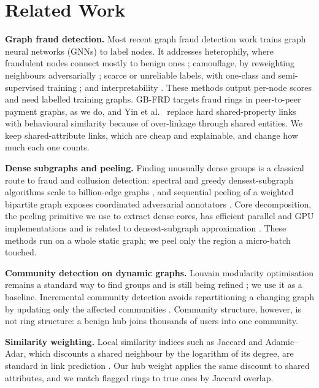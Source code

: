 \section{Related Work}
\label{sec:related}
\textbf{Graph fraud detection.} Most recent graph fraud detection work trains
graph neural networks (GNNs) to label nodes. It addresses heterophily, where
fraudulent nodes connect mostly to benign ones \cite{hu2025hhgfd,lv2026mandate};
camouflage, by reweighting neighbours adversarially \cite{liu2025robust}; scarce
or unreliable labels, with one-class and semi-supervised training
\cite{li2025ocgfd,giles2023suspicious,peng2023csocan}; and interpretability
\cite{yu2024ingfd}. These methods output per-node scores and need labelled
training graphs. GB-FRD \cite{pan2025gbfrd} targets fraud rings in peer-to-peer
payment graphs, as we do, and Yin et al.\ \cite{yin2022behavioral} replace hard
shared-property links with behavioural similarity because of over-linkage
through shared entities. We keep shared-attribute links, which are cheap and
explainable, and change how much each one counts.

\textbf{Dense subgraphs and peeling.} Finding unusually dense groups is a
classical route to fraud and collusion detection: spectral and greedy
densest-subgraph algorithms scale to billion-edge graphs \cite{feng2024unified},
and sequential peeling of a weighted bipartite graph exposes coordinated
adversarial annotators \cite{karaaslanli2025crowd}. Core decomposition, the
peeling primitive we use to extract dense cores, has efficient parallel and
GPU implementations \cite{ahmad2023gpukcore,li2021graphblas} and is related to
densest-subgraph approximation \cite{dhulipala2022dp}. These methods run on a
whole static graph; we peel only the region a micro-batch touched.

\textbf{Community detection on dynamic graphs.} Louvain modularity optimisation
remains a standard way to find groups and is still being refined
\cite{li2023dplouvain}; we use it as a baseline. Incremental community
detection avoids repartitioning a changing graph by updating only the
affected communities \cite{zhang2026incremental,abughofa2021incremental}.
Community structure, however, is not ring structure: a benign hub joins
thousands of users into one community.

\textbf{Similarity weighting.} Local similarity indices such as Jaccard and
Adamic--Adar, which discounts a shared neighbour by the logarithm of its
degree, are standard in link prediction \cite{varma2022jaccard}. Our hub weight
applies the same discount to shared attributes, and we match flagged rings to
true ones by Jaccard overlap.

